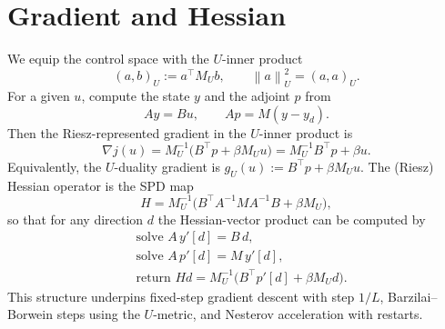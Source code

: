 \documentclass[11pt,a4paper]{article}
\newcommand{\normU}[1]{\left\| #1 \right\|_{U}}
\newcommand{\ipU}[2]{\left( #1, #2 \right)_{U}}
\begin{document}
\section{Gradient and Hessian}\label{sec:grad-hess}
We equip the control space with the $U$-inner product
\begin{equation}
  \ipU{a}{b} := a^\top M_U b, \qquad \normU{a}^2 = \ipU{a}{a}.
\end{equation}
For a given $u$, compute the state $y$ and the adjoint $p$ from
\begin{equation}
  A y = B u, \qquad A p = M (y - y_d).
\end{equation}
Then the Riesz-represented gradient in the $U$-inner product is
\begin{equation}
  \nabla j(u) = M_U^{-1} \big( B^\top p + \beta M_U u \big) = M_U^{-1} B^\top p + \beta u.
\end{equation}
Equivalently, the $U$-duality gradient is $g_U(u) := B^\top p + \beta M_U u$. The (Riesz) Hessian operator is the SPD map
\begin{equation}
  H = M_U^{-1} \big( B^\top A^{-1} M A^{-1} B + \beta M_U \big),
\end{equation}
so that for any direction $d$ the Hessian-vector product can be computed by
\begin{align}
  &\text{solve } A\, y'[d] = B\, d, \\
  &\text{solve } A\, p'[d] = M\, y'[d], \\
  &\text{return } H d = M_U^{-1} \big( B^\top p'[d] + \beta M_U d \big).
\end{align}
This structure underpins fixed-step gradient descent with step $1/L$, Barzilai–Borwein steps using the $U$-metric, and Nesterov acceleration with restarts.

\end{document}
